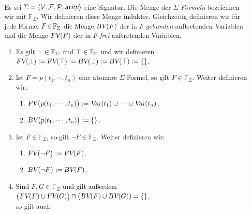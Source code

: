 \begin{Definition} 
\label{praedikaten-formel} \hspace*{\fill} \\
    Es sei $\Sigma = \langle \mathcal{V}, \mathcal{F}, \mathcal{P}, \textsl{arity} \rangle$ eine Signatur.
    Die Menge der {\color{blue}$\Sigma$-\emph{Formeln}} bezeichnen wir mit $\mathbb{F}_\Sigma$.
    Wir definieren diese Menge induktiv.
    Gleichzeitig definieren wir f\"{u}r jede Formel $F\!\in\! \mathbb{F}_\Sigma$ die Menge $\textsl{BV}(F)$ der in $F$ 
    {\emph{\color{blue}gebunden}} auftretenden Variablen und die Menge $\textsl{FV}(F)$ der in $F$ {\emph{\color{blue}frei}} auftretenden Variablen.
    \begin{enumerate}
    \item Es gilt $\bot \in \mathbb{F}_\Sigma$ und $\top \in \mathbb{F}_\Sigma$ und wir definieren \\[0.2cm]
          \hspace*{1.3cm} $\textsl{FV}(\bot) := \textsl{FV}(\top) := \textsl{BV}(\bot) := \textsl{BV}(\top) := \{\}$.
    \item Ist $F = p(t_1,\cdots,t_n)$ eine atomare $\Sigma$-Formel, so gilt $F \in \mathbb{F}_\Sigma$.  Weiter definieren wir:
          \begin{enumerate}
          \item $\textsl{FV}\bigl(p(t_1,\cdots,t_n) \bigr) := \textsl{Var}(t_1) \cup \cdots \cup \textsl{Var}(t_n)$.
          \item $\textsl{BV}\bigl(p(t_1,\cdots,t_n) \bigr) := \{\}$.
          \end{enumerate}
    \item Ist $F \in \mathbb{F}_\Sigma$, so gilt $\neg F \in \mathbb{F}_\Sigma$. Weiter definieren wir:
          \begin{enumerate}
          \item $\textsl{FV}\bigl( \neg F \bigr) := \textsl{FV}(F)$.
          \item $\textsl{BV}\bigl( \neg F \bigr) := \textsl{BV}(F)$.
          \end{enumerate}
    \item Sind $F, G \in \mathbb{F}_\Sigma$ und gilt au\ss{}erdem \\[0.2cm]
          \hspace*{1.3cm}
          $\bigl(\textsl{FV}(F) \cup \textsl{FV}(G)\bigr) \cap \bigl(\textsl{BV}(F) \cup \textsl{BV}(G)) = \{\}$,
          \\[0.2cm]
          so gilt auch
          \begin{enumerate}

\end{enumerate}
\end{enumerate}
\end{Definition}
